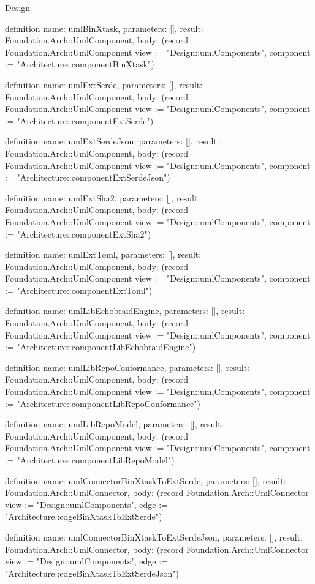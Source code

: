 \begin{lexlean}{Design}
\begin{semanticmodule}
definition{
  name: umlBinXtask,
  parameters: [],
  result: Foundation.Arch::UmlComponent,
  body: (record Foundation.Arch::UmlComponent {view := "Design::umlComponents", component := "Architecture::componentBinXtask"})
}

definition{
  name: umlExtSerde,
  parameters: [],
  result: Foundation.Arch::UmlComponent,
  body: (record Foundation.Arch::UmlComponent {view := "Design::umlComponents", component := "Architecture::componentExtSerde"})
}

definition{
  name: umlExtSerdeJson,
  parameters: [],
  result: Foundation.Arch::UmlComponent,
  body: (record Foundation.Arch::UmlComponent {view := "Design::umlComponents", component := "Architecture::componentExtSerdeJson"})
}

definition{
  name: umlExtSha2,
  parameters: [],
  result: Foundation.Arch::UmlComponent,
  body: (record Foundation.Arch::UmlComponent {view := "Design::umlComponents", component := "Architecture::componentExtSha2"})
}

definition{
  name: umlExtToml,
  parameters: [],
  result: Foundation.Arch::UmlComponent,
  body: (record Foundation.Arch::UmlComponent {view := "Design::umlComponents", component := "Architecture::componentExtToml"})
}

definition{
  name: umlLibEchobraidEngine,
  parameters: [],
  result: Foundation.Arch::UmlComponent,
  body: (record Foundation.Arch::UmlComponent {view := "Design::umlComponents", component := "Architecture::componentLibEchobraidEngine"})
}

definition{
  name: umlLibRepoConformance,
  parameters: [],
  result: Foundation.Arch::UmlComponent,
  body: (record Foundation.Arch::UmlComponent {view := "Design::umlComponents", component := "Architecture::componentLibRepoConformance"})
}

definition{
  name: umlLibRepoModel,
  parameters: [],
  result: Foundation.Arch::UmlComponent,
  body: (record Foundation.Arch::UmlComponent {view := "Design::umlComponents", component := "Architecture::componentLibRepoModel"})
}

definition{
  name: umlConnectorBinXtaskToExtSerde,
  parameters: [],
  result: Foundation.Arch::UmlConnector,
  body: (record Foundation.Arch::UmlConnector {view := "Design::umlComponents", edge := "Architecture::edgeBinXtaskToExtSerde"})
}

definition{
  name: umlConnectorBinXtaskToExtSerdeJson,
  parameters: [],
  result: Foundation.Arch::UmlConnector,
  body: (record Foundation.Arch::UmlConnector {view := "Design::umlComponents", edge := "Architecture::edgeBinXtaskToExtSerdeJson"})
}


\end{semanticmodule}
\end{lexlean}
